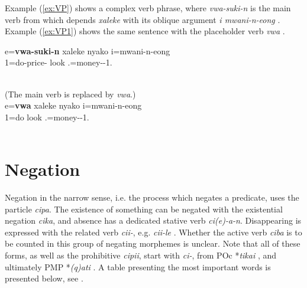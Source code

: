 Example (\ref{ex:VP}) shows a complex verb phrase, where \textit{vwa-suki-n}   is the main verb from which depends \textit{xaleke}  with its oblique argument \textit{i mwani-n-eong} . Example (\ref{ex:VP1}) shows the same sentence with the placeholder verb \textit{vwa} .

\ea \label{ex:VP}
\gll e=\textbf{vwa-suki-n} xaleke nyako i=mwani-n-eong\\ 
 1=do-price- look  .=money--1.\\ 
\glt {}\\
\z


\ea\label{ex:VP1}
(The main verb is replaced by \textit{vwa}.)\\
\gll e=\textbf{vwa} xaleke nyako i=mwani-n-eong\\ 
 1=do look  .=money--1.\\ 
\glt {}\\
\z

\section{Negation}
\label{sec:negation}

Negation in the narrow sense, i.e. the process which negates a predicate, uses the particle \textit{cipa}. The existence of something can be negated with the existential negation \textit{cika}, and absence has a dedicated stative verb \textit{ci(e)-a-n}. Disappearing is expressed with the related verb \textit{cii-}, e.g. \textit{cii-le} . Whether the active verb \textit{ciba}  is to be counted in this group of negating morphemes is unclear. Note that all of these forms, as well as the prohibitive \textit{cipii}, start with \textit{ci-}, from POc *\textit{tikai}  \parencite[88]{lynch_oceanic_2002}, and ultimately PMP *\textit{(q)ati} \parencite[88]{lynch_oceanic_2002}. A table presenting the most important words is presented below, see .

